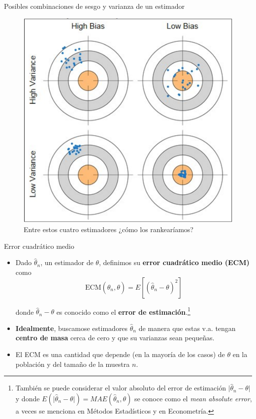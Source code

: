 \documentclass{beamer}
\theoremstyle{definition}
\begin{document}
\begin{frame}{\color{rosee}\small Posibles combinaciones de sesgo y varianza de un estimador}
  \begin{figure}
    \centering
    \includegraphics[height=.77\textheight]{slides3/img/bias_var.png}
    \caption{Entre estos cuatro estimadores ¿cómo los rankearíamos?}
  \end{figure}
\end{frame}



\begin{frame}{\color{rosee}Error cuadr\'atico medio} \small \begin{itemize}
       \item  Dado $\widehat{\theta}_n$, un estimador de $\theta$, definimos su
    \textbf{error cuadr\'atico medio (ECM)} como
    \[\text{ECM}(\widehat{\theta}_n,\theta) = E\left[ \left(\widehat{\theta}_n - \theta\right)^{2} \right]\]
  
  \noindent donde $\widehat{\theta}_n-\theta$ es conocido como el \textbf{error de estimaci\'on}.\footnote{También se puede considerar el valor absoluto del error de estimación $ \vert \widehat{\theta}_n - \theta \vert$ y donde $E( \vert \widehat{\theta}_n - \theta \vert)=MAE(\widehat{\theta}_n,\theta)$ se conoce como el \textit{mean absolute error}, a veces se menciona en Métodos Estadísticos y en Econometría.}
  
 \item   \textbf{Idealmente}, buscamose estimadores $\widehat{\theta}_n$ de manera que estas v.a. tengan \textbf{centro de masa} cerca de cero y que su varianzas sean pequeñas.

  

 \item  El ECM es una cantidad que depende (en la mayoría de los casos) de $\theta$ en la población y del tamaño de la muestra $n$.
  \end{itemize}
\end{frame}
\end{document}
